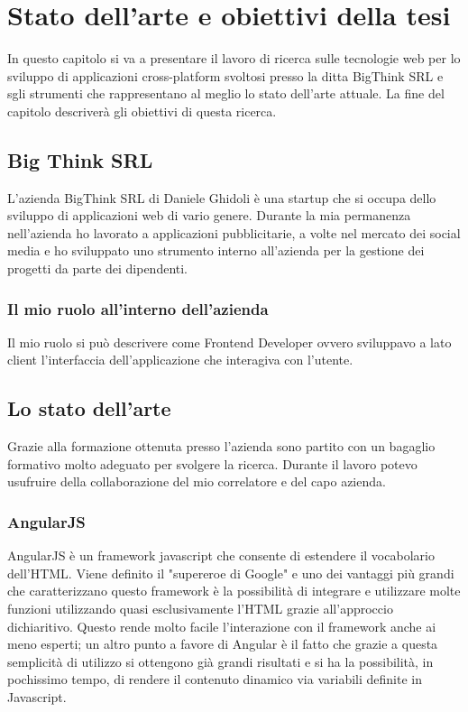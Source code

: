 \chapter{Stato dell'arte e obiettivi della tesi}
In questo capitolo si va a presentare il lavoro di ricerca sulle tecnologie web per lo sviluppo di applicazioni cross-platform svoltosi presso la ditta BigThink SRL e sgli strumenti che rappresentano al meglio lo stato dell'arte attuale. La fine del capitolo descriverà gli obiettivi di questa ricerca.

\section{Big Think SRL}
L'azienda BigThink SRL di Daniele Ghidoli è una startup che si occupa dello sviluppo di applicazioni web di vario genere. Durante la mia permanenza nell'azienda ho lavorato a applicazioni pubblicitarie, a volte nel mercato dei social media e ho sviluppato uno strumento interno all'azienda per la gestione dei progetti da parte dei dipendenti. 
\subsection{Il mio ruolo all'interno dell'azienda}
Il mio ruolo si può descrivere come Frontend Developer ovvero sviluppavo a lato client l'interfaccia dell'applicazione che interagiva con l'utente. 
\section{Lo stato dell'arte}
Grazie alla formazione ottenuta presso l'azienda sono partito con un bagaglio formativo molto adeguato per svolgere la ricerca. Durante il lavoro potevo usufruire della collaborazione del mio correlatore e del capo azienda.
\subsection{AngularJS}
AngularJS è un framework javascript che consente di estendere il vocabolario dell'HTML. Viene definito il "supereroe di Google" e uno dei vantaggi più grandi che caratterizzano questo framework è la possibilità di integrare e utilizzare molte funzioni utilizzando quasi esclusivamente l’HTML grazie all'approccio dichiaritivo. Questo rende molto facile l'interazione con il framework anche ai meno esperti; un altro punto a favore di Angular è il fatto che grazie a questa semplicità di utilizzo si ottengono già grandi risultati e si ha la possibilità, in pochissimo tempo, di rendere il contenuto dinamico via variabili definite in Javascript.
